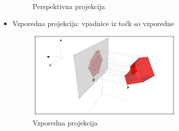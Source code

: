 \documentclass{article}
\begin{document}
\begin{itemize}
\begin{figure}[H]
        \caption{Perspektivna projekcija}
        \end{figure}     
    \item Vzporedna projekcija: vpadnice iz točk so vzporedne
        \begin{figure}[H]
        \centering
        \includegraphics[width=75mm]{src/vzporedna_projekcija.png}
        \caption{Vzporedna projekcija}
        \end{figure}     
\end{itemize}
\end{document}
